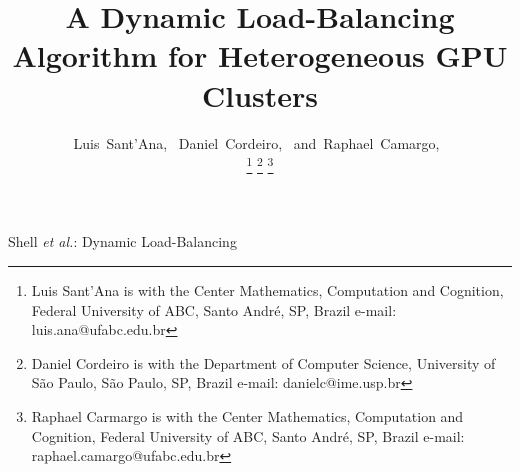 \documentclass[journal]{IEEEtran}
\begin{document}
%
\title{A Dynamic Load-Balancing Algorithm for Heterogeneous GPU Clusters}
%
%
%

\author{Luis~Sant'Ana,~
        Daniel~Cordeiro,~
        and~Raphael~Camargo,~%

\thanks{Luis Sant'Ana is with the Center Mathematics, Computation and Cognition, Federal University of ABC, Santo Andr\'{e}, SP, Brazil e-mail: luis.ana@ufabc.edu.br}%
\thanks{Daniel Cordeiro is with the Department of Computer Science, University of S\~{a}o Paulo, S\~{a}o Paulo, SP, Brazil e-mail: danielc@ime.usp.br }%
\thanks{Raphael Carmargo is with the Center Mathematics, Computation and Cognition, Federal University of ABC, Santo Andr\'{e}, SP, Brazil e-mail: raphael.camargo@ufabc.edu.br}}

% 
%



%
{Shell \MakeLowercase{\textit{et al.}}:  Dynamic Load-Balancing}
% 
\end{document}

